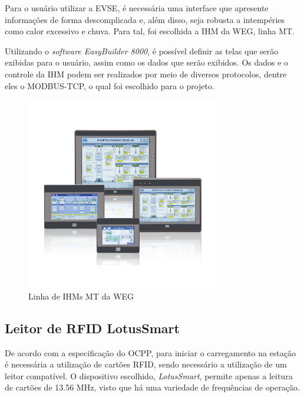       Para o usuário utilizar a \ac{EVSE}, é necessária uma interface que apresente informações de forma descomplicada e, além disso, seja robusta a intempéries como calor excessivo e chuva. Para tal, foi escolhida a \ac{IHM} da WEG, linha MT.

      Utilizando o \textit{software EasyBuilder 8000}, é possível definir as telas que serão exibidas para o usuário, assim como os dados que serão exibidos. Os dados e o controle da IHM podem ser realizados por meio de diversos protocolos, dentre eles o MODBUS-TCP, o qual foi escolhido para o projeto.

      \begin{figure}[H]
        \begin{center}
          \includegraphics[width=0.75\textwidth,natwidth=400,natheight=288]{assets/images/devices-hmi.jpg}
          \caption{Linha de IHMs MT da WEG}
          \label{fig:ihm}
        \end{center}
      \end{figure}

    \subsection{Leitor de RFID LotusSmart}

      De acordo com a especificação do \ac{OCPP}, para iniciar o carregamento na estação é necessária a utilização de cartões \ac{RFID}, sendo necessário a utilização de um leitor compatível. O dispositivo escolhido, \textit{LotusSmart}, permite apenas a leitura de cartões de 13.56 MHz, visto que há uma variedade de frequências de operação.

